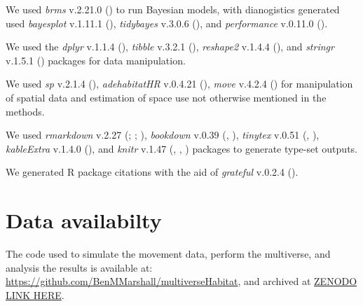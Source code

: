 \documentclass[10pt,a4paper]{article}
\begin{document}
We used \emph{brms} v.2.21.0 () to run Bayesian models, with dianogistics generated used \emph{bayesplot} v.1.11.1 (), \emph{tidybayes} v.3.0.6 (), and \emph{performance} v.0.11.0 ().

We used the \emph{dplyr} v.1.1.4 (), \emph{tibble} v.3.2.1 (), \emph{reshape2} v.1.4.4 (), and \emph{stringr} v.1.5.1 () packages for data manipulation.

We used \emph{sp} v.2.1.4 (), \emph{adehabitatHR} v.0.4.21 (), \emph{move} v.4.2.4 () for manipulation of spatial data and estimation of space use not otherwise mentioned in the methods.

We used \emph{rmarkdown} v.2.27 (; ; ), \emph{bookdown} v.0.39 (, ), \emph{tinytex} v.0.51 (, ), \emph{kableExtra} v.1.4.0 (), and \emph{knitr} v.1.47 (, , ) packages to generate type-set outputs.

We generated R package citations with the aid of \emph{grateful} v.0.2.4 ().

\section{Data availabilty}\label{data-availabilty}

The code used to simulate the movement data, perform the multiverse, and analysis the results is available at: \url{https://github.com/BenMMarshall/multiverseHabitat}, and archived at \href{zenodo.org\%20-\%20FIX\%20THIS}{ZENODO LINK HERE}.

\clearpage
\end{document}
